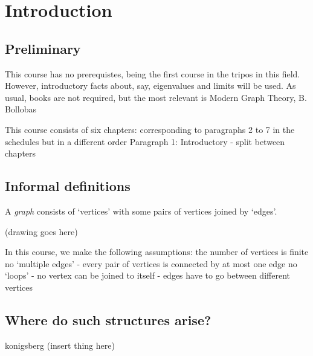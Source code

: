 \documentclass{article}
\begin{document}
\maketitle

\section{Introduction}

\subsection{Preliminary}
This course has no prerequistes, being the first course in the tripos in this field.  However, introductory facts about, say, eigenvalues and limits will be used.
As usual, books are not required, but the most relevant is Modern Graph Theory, B. Bollobas


This course consists of six chapters: corresponding to paragraphs 2 to 7 in the schedules but in a different order
Paragraph 1: Introductory - split between chapters

\subsection{Informal definitions}
A \emph{graph} consists of `vertices' with some pairs of vertices joined by `edges'.
\begin{center}
\end{center}

(drawing goes here)

In this course, we make the following assumptions:
the number of vertices is finite
no `multiple edges' - every pair of vertices is connected by at most one edge
no `loops' - no vertex can be joined to itself - edges have to go between different vertices

\subsection{Where do such structures arise?}
konigsberg (insert thing here)
\end{document}
